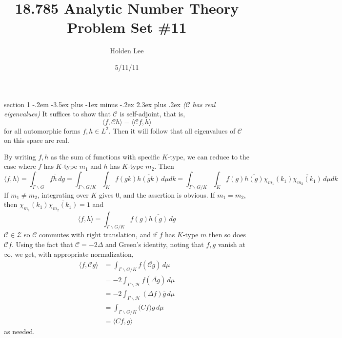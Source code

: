 \documentclass[12pt]{article}
\makeatletter
\theoremstyle{norm}
\providecommand{\cal}[1]{\mathcal{#1}}
\renewcommand{\cal}[1]{\mathcal{#1}}
\newcommand{\Ga}[0]{\Gamma}
\newcommand{\De}[0]{\Delta}
\newcommand{\an}[1]{\langle {#1}\rangle}
\newcommand{\bs}[0]{\backslash}
\newcommand{\ol}[1]{\overline{#1}}
\newcommand{\iy}[0]{\infty}
\newenvironment{problem}{\@startsection
       {section}
       {1}
       {-.2em}
       {-3.5ex plus -1ex minus -.2ex}
       {2.3ex plus .2ex}
       {\pagebreak[3]%
       \large\bf\noindent{Problem }
       }
       }
       {
       }
\makeatother
\begin{document}
\title{18.785 Analytic Number Theory Problem Set \#11}%
\author{Holden Lee}
\date{5/11/11}%
\maketitle
\thispagestyle{empty}
\begin{problem}{\it ($\cal C$ has real eigenvalues)}
It suffices to show that $\cal C$ is self-adjoint, that is,
\[
\an{f, \cal Ch}=\an{\cal Cf,h}
\]
for all automorphic forms $f,h\in L^2$. Then it will follow that all eigenvalues of $\cal C$ on this space are real.

By writing $f,h$ as the sum of functions with specific $K$-type, we can reduce to the case where $f$ has $K$-type $m_1$ and $h$ has $K$-type $m_2$. Then
\[
\an{f,h}=\int_{\Ga\bs G}f\ol{h}\,dg=\int_{\Ga\bs G/K}\int_K f(gk)\ol{h(gk)} \,d\mu dk=\int_{\Ga\bs G/K}\int_K f(g)\ol{h(g)}\chi_{m_1}(k_1)\ol{\chi_{m_2}(k_1)} \,d\mu dk
\]
If $m_1\ne m_2$, integrating over $K$ gives 0, and the assertion is obvious. If $m_1=m_2$, then $ \chi_{m_1}(k_1)\ol{\chi_{m_2}(k_1)}=1$ and 
%
\[
\an{f,h}
=\int_{\Ga\bs G/K} f(g)\ol{h(g)}\,dg%
\]
$\cal C\in \cal Z$ so $\cal C$ commutes with right translation, and if $f$ has $K$-type $m$ then so does $\cal Cf$. 
Using the fact that $\cal C=-2\De$ and Green's identity, noting that $f,g$ vanish at $\iy$, we get, with appropriate normalization,
\begin{align*}
\an{f,\cal Cg}&=\int_{\Ga\bs G/K} f (\ol{\cal Cg})\,d\mu\\
&=-2\int_{\Ga\bs \cal H}f (\ol{\De g})\,d\mu\\
&=-2\int_{\Ga\bs \cal H} (\De f)\ol{g}\,d\mu\\
&=\int_{\Ga\bs G/K} \cal (Cf) \ol{g}\,d\mu\\
&=\an{Cf,g}
\end{align*}
as needed.
\end{problem}
\end{document}
